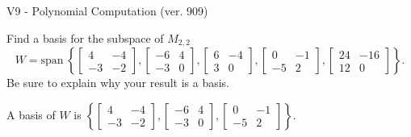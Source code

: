 \begin{exercise}
  \begin{exerciseTitle}V9 - Polynomial Computation (ver. 909)\end{exerciseTitle}
  \begin{exerciseStatement}
    Find a basis for the subspace of \(M_{2,2}\) 
\[W=\mathrm{span}\ \left\{\left[\begin{array}{cc}
4 & -4 \\
-3 & -2
\end{array}\right] , \left[\begin{array}{cc}
-6 & 4 \\
-3 & 0
\end{array}\right] , \left[\begin{array}{cc}
6 & -4 \\
3 & 0
\end{array}\right] , \left[\begin{array}{cc}
0 & -1 \\
-5 & 2
\end{array}\right] , \left[\begin{array}{cc}
24 & -16 \\
12 & 0
\end{array}\right]\right\}.\]
 Be sure to explain why your result is a basis.


  \end{exerciseStatement}
  \begin{exerciseAnswer}
   A basis of \(W\) is  \(\left\{\left[\begin{array}{cc}
4 & -4 \\
-3 & -2
\end{array}\right] , \left[\begin{array}{cc}
-6 & 4 \\
-3 & 0
\end{array}\right] , \left[\begin{array}{cc}
0 & -1 \\
-5 & 2
\end{array}\right]\right\}\).
  


  \end{exerciseAnswer}
\end{exercise}